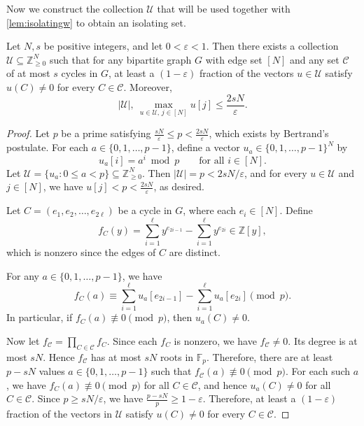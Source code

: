 \documentclass[11pt]{article}
\newcommand{\eps}{\varepsilon}
\renewcommand{\epsilon}{\eps}
\newcommand{\F}{\mathbb{F}}
\newcommand{\Z}{\mathbb{Z}}
\begin{document}
Now we construct the collection $\mathcal{U}$ that will be used together with \cref{lem:isolatingw} to obtain an isolating set.

\begin{claim}\label{cl:circulationWeights}
Let $N,s$ be positive integers, and let $0<\epsilon<1$. Then there exists a collection $\mathcal{U}\subseteq \Z_{\ge 0}^{N}$ such that for any bipartite graph $G$ with edge set $[N]$ and any set $\mathcal{C}$ of at most $s$ cycles in $G$, at least a $(1-\epsilon)$ fraction of the vectors $u\in \mathcal{U}$ satisfy $u(C)\neq 0$ for every $C\in \mathcal{C}$. Moreover,
\[
|\mathcal{U}|,\ \max_{u\in \mathcal{U},\, j\in [N]} u[j] \le \frac{2sN}{\epsilon}.
\]
\end{claim}

\begin{proof}
Let $p$ be a prime satisfying $\frac{sN}{\epsilon}\le p< \frac{2sN}{\epsilon}$, which exists by Bertrand's postulate. For each $a\in \{0,1,\dots,p-1\}$, define a vector $u_a\in \{0,1,\dots,p-1\}^N$ by
\[
u_a[i]=a^i \bmod p \qquad \text{for all } i\in [N].
\]
Let $\mathcal{U}=\{u_a:0\le a<p\}\subseteq \Z_{\ge 0}^N$. Then $|\mathcal{U}|=p<2sN/\epsilon$, and for every $u\in\mathcal{U}$ and $j\in[N]$, we have $u[j]<p<\frac{2sN}{\epsilon}$, as desired.

Let $C=(e_1,e_2,\dots,e_{2\ell})$ be a cycle in $G$, where each $e_i\in [N]$. Define
\[
f_C(y)=\sum_{i=1}^{\ell} y^{e_{2i-1}}-\sum_{i=1}^{\ell} y^{e_{2i}} \in \Z[y],
\]
which is nonzero since the edges of $C$ are distinct.

For any $a\in \{0,1,\dots,p-1\}$, we have
\[
f_C(a)\equiv \sum_{i=1}^{\ell} u_a[e_{2i-1}] - \sum_{i=1}^{\ell} u_a[e_{2i}] \pmod p.
\]
In particular, if $f_C(a)\not\equiv 0\pmod p$, then $u_a(C)\neq 0$.

Now let $f_{\mathcal{C}}=\prod_{C\in \mathcal{C}} f_C$. Since each $f_C$ is nonzero, we have $f_{\mathcal{C}}\neq 0$. Its degree is at most $sN$. Hence $f_{\mathcal{C}}$ has at most $sN$ roots in $\F_p$. Therefore, there are at least $p-sN$ values $a\in \{0,1,\dots,p-1\}$ such that $f_{\mathcal{C}}(a)\not\equiv 0\pmod p$. For each such $a$, we have $f_C(a)\not\equiv 0\pmod p$ for all $C\in\mathcal{C}$, and hence $u_a(C)\neq 0$ for all $C\in\mathcal{C}$. Since $p\ge sN/\epsilon$, we have $\frac{p-sN}{p}\ge 1-\epsilon$. Therefore, at least a $(1-\epsilon)$ fraction of the vectors in $\mathcal{U}$ satisfy $u(C)\neq 0$ for every $C\in\mathcal{C}$.
\end{proof}
\end{document}
